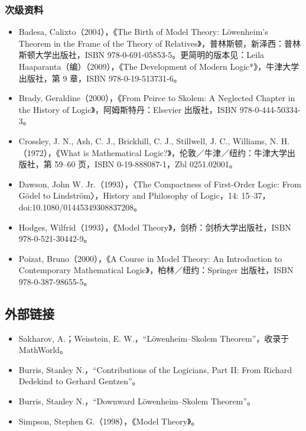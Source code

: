 \subsubsection{次级资料}
\begin{itemize}
\item Badesa, Calixto（2004），《The Birth of Model Theory: Löwenheim's Theorem in the Frame of the Theory of Relatives》，普林斯顿，新泽西：普林斯顿大学出版社，ISBN 978-0-691-05853-5。更简明的版本见：Leila Haaparanta（编）（2009），《The Development of Modern Logic*》，牛津大学出版社，第 9 章，ISBN 978-0-19-513731-6。
\item Brady, Geraldine（2000），《From Peirce to Skolem: A Neglected Chapter in the History of Logic》，阿姆斯特丹：Elsevier 出版社，ISBN 978-0-444-50334-3。
\item Crossley, J. N., Ash, C. J., Brickhill, C. J., Stillwell, J. C., Williams, N. H.（1972），《What is Mathematical Logic?》，伦敦／牛津／纽约：牛津大学出版社，第 59–60 页，ISBN 0-19-888087-1，Zbl 0251.02001。
\item Dawson, John W. Jr.（1993），〈The Compactness of First-Order Logic: From Gödel to Lindström〉，History and Philosophy of Logic，14: 15–37，doi:10.1080/01445349308837208。
\item Hodges, Wilfrid（1993），《Model Theory》，剑桥：剑桥大学出版社，ISBN 978-0-521-30442-9。
\item Poizat, Bruno（2000），《A Course in Model Theory: An Introduction to Contemporary Mathematical Logic》，柏林／纽约：Springer 出版社，ISBN 978-0-387-98655-5。
\end{itemize}
\subsection{外部链接}
\begin{itemize}
\item Sakharov, A.；Weisstein, E. W.，“Löwenheim–Skolem Theorem”，收录于 MathWorld。
\item Burris, Stanley N.，“Contributions of the Logicians, Part II: From Richard Dedekind to Gerhard Gentzen”。
\item Burris, Stanley N.，“Downward Löwenheim–Skolem Theorem”。
\item Simpson, Stephen G.（1998），《Model Theory》。
\end{itemize}
